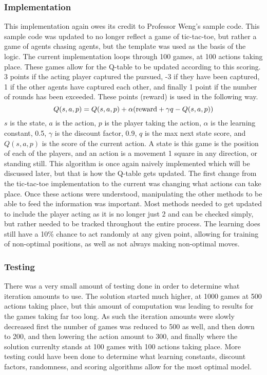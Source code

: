 \documentclass[letterpaper, 10 pt, conference]{ieeeconf}   %
\begin{document}
\subsubsection{Implementation}
This implementation again owes its credit to Professor Weng's sample code. This sample code was updated to no longer
reflect a game of tic-tac-toe, but rather a game of agents chasing agents, but the template was used as the basis of the logic.
The current implementation loops through 100 games, at 100 actions taking place. These games allow for the Q-table to be updated according to
this scoring. 3 points if the acting player captured the pursued, -3 if they have been captured, 1 if the other agents have captured each other,
and finally 1 point if the number of rounds has been exceeded.
These points (reward) is used in the following way.
$$Q(s, a, p) = Q(s, a, p) + \alpha(\textnormal{reward} + \gamma q - Q(s, a, p))$$
$s$ is the state, $a$ is the action, $p$ is the player taking the action, $\alpha$ is the learning constant, 0.5, $\gamma$ is the discount factor, 0.9,
$q$ is the max next state score, and $Q(s, a, p)$ is the score of the current action.
A state is this game is the position of each of the players, and an action is a movement 1 square in any direction, or standing still.
This algorithm is once again naively implemented which will be
discussed later, but that is how the Q-table gets updated. The first change from the tic-tac-toe implementation to the current was changing what actions can take place.
Once these actions were understood, manipulating the other methods to be able to feed the information was important. Most methods needed to get updated to include
the player acting as it is no longer just 2 and can be checked simply, but rather needed to be tracked throughout the entire process. The learning does still have
a 10\% chance to act randomly at any given point, allowing for training of non-optimal positions, as well as not always making non-optimal moves.

\subsubsection{Testing}
There was a very small amount of testing done in order to determine what iteration amounts to use. The solution started much higher, at 1000 games at 500
actions taking place, but this amount of computation was leading to results for the games taking far too long. As such the iteration amounts were slowly decreased
first the number of games was reduced to 500 as well, and then down to 200, and then lowering the action amount to 300, and finally where the solution currenlty
stands at 100 games with 100 actions taking place. More testing could have been done to determine what learning constants, discount factors, randomness,
and scoring algorithms allow for the most optimal model.
\end{document}
